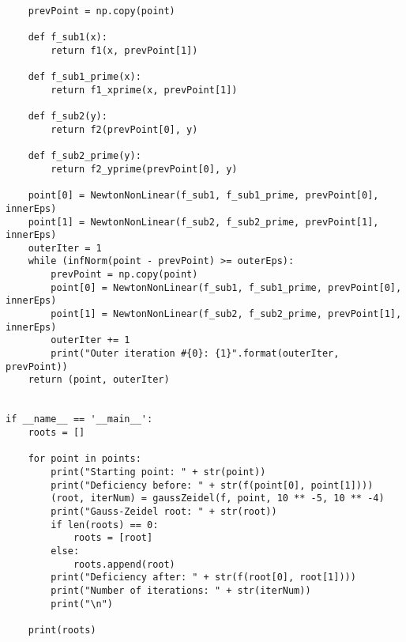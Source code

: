 \documentclass[14pt, a4paper]{article}
\begin{document}
\begin{lstlisting}
    prevPoint = np.copy(point)
    
    def f_sub1(x):
        return f1(x, prevPoint[1])
    
    def f_sub1_prime(x):
        return f1_xprime(x, prevPoint[1])

    def f_sub2(y):
        return f2(prevPoint[0], y)
    
    def f_sub2_prime(y):
        return f2_yprime(prevPoint[0], y)

    point[0] = NewtonNonLinear(f_sub1, f_sub1_prime, prevPoint[0], innerEps)
    point[1] = NewtonNonLinear(f_sub2, f_sub2_prime, prevPoint[1], innerEps)
    outerIter = 1
    while (infNorm(point - prevPoint) >= outerEps):   
        prevPoint = np.copy(point)
        point[0] = NewtonNonLinear(f_sub1, f_sub1_prime, prevPoint[0], innerEps)
        point[1] = NewtonNonLinear(f_sub2, f_sub2_prime, prevPoint[1], innerEps) 
        outerIter += 1
        print("Outer iteration #{0}: {1}".format(outerIter, prevPoint))
    return (point, outerIter)


if __name__ == '__main__':
    roots = []

    for point in points:
        print("Starting point: " + str(point))
        print("Deficiency before: " + str(f(point[0], point[1])))
        (root, iterNum) = gaussZeidel(f, point, 10 ** -5, 10 ** -4)
        print("Gauss-Zeidel root: " + str(root))
        if len(roots) == 0:
            roots = [root]
        else:
            roots.append(root)
        print("Deficiency after: " + str(f(root[0], root[1])))
        print("Number of iterations: " + str(iterNum))
        print("\n")

    print(roots)
\end{lstlisting}
\end{document}
